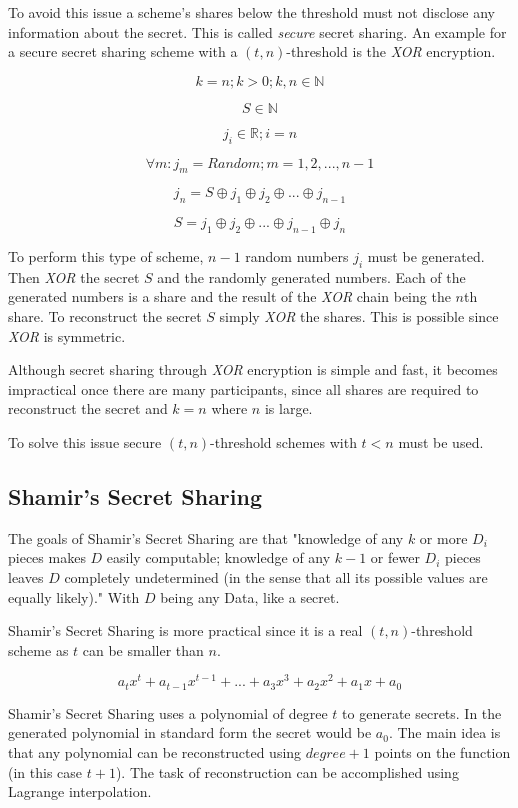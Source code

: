 To avoid this issue a scheme's shares below the threshold must not disclose any
information about the secret. This is called \textit{secure} secret sharing.
An example for a secure secret sharing scheme with a $(t, n)$-threshold is the
\textit{XOR} encryption.

$$k = n; k > 0;k, n \in \mathbb{N}$$

$$S \in \mathbb{N}$$

$$j_{i} \in \mathbb{R}; i = n$$

$$\forall m: j_{m} = Random; m = {1, 2, ..., n-1}$$

$$j_{n} = S \oplus j_{1} \oplus j_{2} \oplus ... \oplus j_{n-1} $$

$$S = j_{1} \oplus j_{2} \oplus ... \oplus j_{n-1} \oplus j_{n} $$

To perform this type of scheme, $n-1$ random numbers $j_{i}$ must be generated.
Then \textit{XOR} the secret $S$ and the randomly generated numbers. Each of
the generated numbers is a share and the result of the \textit{XOR} chain being
the $n$th share. To reconstruct the secret $S$ simply \textit{XOR} the shares.
This is possible since \textit{XOR} is symmetric.

Although secret sharing through \textit{XOR} encryption is simple and fast, it
becomes impractical once there are many participants, since all shares are
required to reconstruct the secret and $k = n$ where $n$ is large.

To solve this issue secure $(t, n)$-threshold schemes with $t < n$ must be
used.

\subsection{Shamir's Secret Sharing}

The goals of Shamir's Secret Sharing are that "knowledge of any $k$ or more
$D_i$ pieces makes $D$ easily computable; knowledge of any $k - 1$ or fewer
$D_i$ pieces leaves $D$ completely undetermined (in the sense that all its
possible values are equally likely)." With $D$ being any Data, like a secret.
\cite{how_to_share_a_secret}

Shamir's Secret Sharing is more practical since it is a real $(t, n)$-threshold
scheme as $t$ can be smaller than $n$.

$$a_{t}x^t + a_{t-1}x^{t-1} + ... + a_{3}x^3 + a_{2}x^2 + a_{1}x + a_0 $$

Shamir's Secret Sharing uses a polynomial of degree $t$ to generate secrets.
In the generated polynomial in standard form the secret would be $a_0$. The
main idea is that any polynomial can be reconstructed using $degree + 1$ points
on the function (in this case $t + 1$). The task of reconstruction can be accomplished using Lagrange
interpolation.

